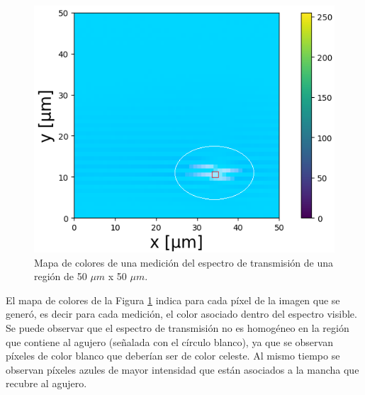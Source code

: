  \begin{figure}[H]
	\centering
	\includegraphics[width=1.0\textwidth]{Figs/microespectrometro/imhueco.png}
	\caption{Mapa de colores de una medición del espectro de transmisión de una región de 50 $\mu m$ x 50 $\mu m$.}
	\label{fig:mapargbag}
\end{figure}

El mapa de colores de la Figura \ref{fig:mapargbag} indica para cada píxel de la imagen que se generó, es decir para cada medición, el color asociado dentro del espectro visible. Se puede observar que el espectro de transmisión no es homogéneo en la región que contiene al agujero (señalada con el círculo blanco), ya que se observan píxeles de color blanco que deberían ser de color celeste. Al mismo tiempo se observan píxeles azules de mayor intensidad que están asociados a la mancha que recubre al agujero. 

